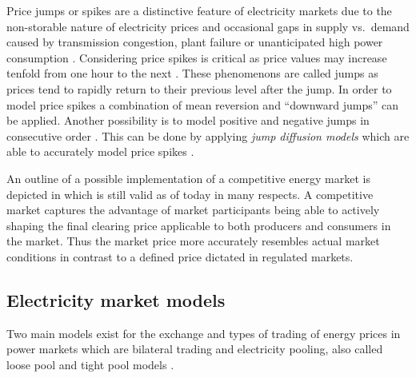 Price jumps or spikes are a distinctive feature of electricity markets due to the non-storable nature of electricity prices and occasional gaps in supply vs.~demand caused by transmission congestion, plant failure or unanticipated high power consumption \cite{weron2004modelingmarkets, weron2007modeling}. 
Considering price spikes is critical as price values may increase tenfold from one hour to the next \cite{huisman2007hourly}. 
These phenomenons are called jumps as prices tend to rapidly return to their previous level after the jump. In order to model price spikes a combination of mean reversion and "`downward jumps"' can be applied. Another possibility is to model positive and negative jumps in consecutive order \cite{weron2004modeling}. This can be done by applying \textit{jump diffusion models} which are able to accurately model price spikes \cite{weron2004modeling}. 




An outline of a possible implementation of a competitive energy market is depicted in \cite{hogan1993competitive} which is still valid as of today in many respects. A competitive market captures the advantage of market participants being able to actively shaping the final clearing price applicable to both producers and consumers in the market. Thus the market price more accurately resembles actual market conditions in contrast to a defined price dictated in regulated markets. 




\subsection{Electricity market models}

Two main models exist for the exchange and types of trading of energy prices in power markets which are bilateral trading and electricity pooling, also called loose pool and tight pool models \cite{onaiwu2009does,hogan1997reshaping,barroso2005classification,chao1999design}.

